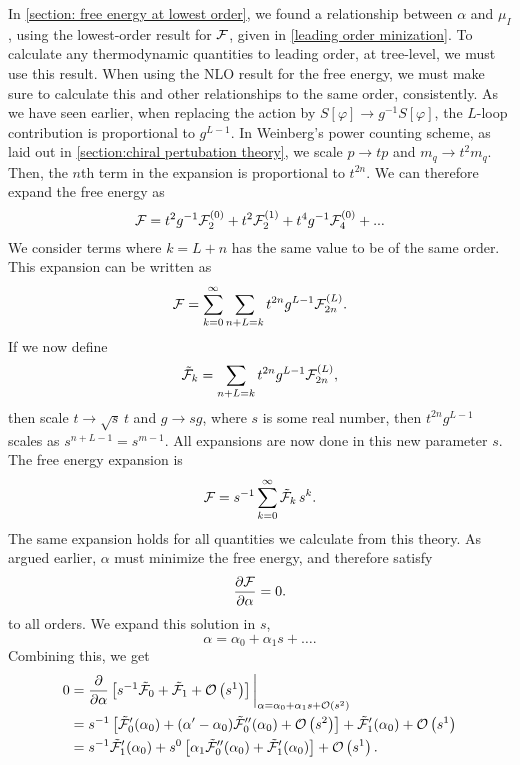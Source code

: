 In \autoref{section: free energy at lowest order}, we found a relationship between $\alpha$ and $\mu_I$, using the lowest-order result for $\mathcal{F}$, given in \cref{leading order minization}.
To calculate any thermodynamic quantities to leading order, at tree-level, we must use this result.
When using the NLO result for the free energy, we must make sure to calculate this and other relationships to the same order, consistently.
As we have seen earlier, when replacing the action by $S[\varphi] \rightarrow g^{-1}S[\varphi]$, the $L$-loop contribution is proportional to $g^{L-1}$.
In Weinberg's power counting scheme, as laid out in \autoref{section:chiral pertubation theory}, we scale $p \rightarrow t p$ and $m_q \rightarrow t^2 m_q$.
Then, the $n$th term in the expansion is proportional to $t^{2n}$.
We can therefore expand the free energy as
\begin{equation}
    \mathcal{F} = t^2 g^{-1} \mathcal{F}_2^{(0)} + t^2 \mathcal{F}_2^{(1)} + t^4 g^{-1} \mathcal{F}_4^{(0)}
    + ...
\end{equation}
We consider terms where $k = L + n$ has the same value to be of the same order.
This expansion can be written as
\begin{equation}
    \mathcal{F} = \sum_{k=0}^\infty \sum_{n+L=k} t^{2n} g^{L-1} \mathcal{F}_{2n}^{(L)}.
\end{equation}
If we now define
\begin{equation}
    \tilde {\mathcal{F}}_k = \sum_{n+L=k} t^{2n} g^{L-1} \mathcal{F}_{2n}^{(L)},
\end{equation}
then scale $t \rightarrow \sqrt{s} \, t$ and $g \rightarrow s g$, where $s$ is some real number, then $t^{2n}g^{L-1}$ scales as $s^{n+L-1} = s^{m-1}$.
All expansions are now done in this new parameter $s$.
The free energy expansion is
\begin{equation}
    \mathcal{F} = s^{-1}\sum_{k = 0}^\infty \tilde {\mathcal{F}}_k \, s^{k}.
\end{equation}
The same expansion holds for all quantities we calculate from this theory.
As argued earlier, $\alpha$ must minimize the free energy, and therefore satisfy
\begin{equation}
    \diffp{\Ef}{\alpha} = 0.
\end{equation}
to all orders.
We expand this solution in $s$,
\begin{equation}
    \alpha = \alpha_0 + \alpha_1 s + \dots.
\end{equation}
Combining this, we get
\begin{align}
    \nonumber
    0 &
    = 
    \diffp{}{\alpha}
    \left[
        s^{-1}\tilde \Ef_0
        + 
        \tilde \Ef_1
        +
        \Oh[1]{s}
    \right]
    \bigg|_{\alpha=\alpha_0 + \alpha_1 s + \Oh{s}} 
    \\ \nonumber
    & = 
    s^{-1 }
    \left[
        \tilde \Ef_0'(\alpha_0)
        +
        (\alpha' - \alpha_0)
        \tilde \Ef_0''(\alpha_0)
        +
        \Oh[2]{s}
    \right]
    +
    \tilde\Ef_1'(\alpha_0)
    +
    \Oh[1]{s} \\
    &
    =
    s^{-1} \tilde\Ef_1'(\alpha_0)
    + s^{0}
    \left[
        \alpha_1
        \tilde \Ef_0''(\alpha_0)
        +
    \tilde\Ef_1'(\alpha_0)
    \right]
    +
    \Oh[1]{s}.
    \label{minimizing free energy expansion}
\end{align}
